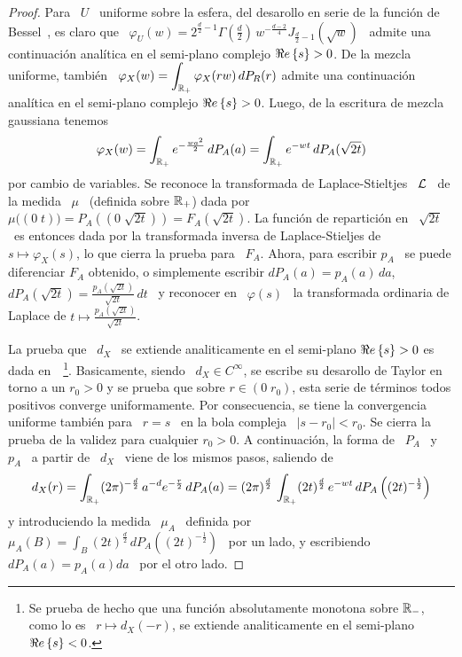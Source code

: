 \begin{proof}
  Para \ $U$ \ uniforme sobre la  esfera, del desarollo en serie de la funci\'on
  de   Bessel~\cite[Ec.~8.402]{GraRyz15},  es  claro   que  \   $\varphi_U(w)  =
  2^{\frac{d}{2}-1}  \Gamma\left(   \frac{d}{2}  \right)  \,  w^{-\frac{d-2}{4}}
  J_{\frac{d}{2}-1}(\sqrt{w})$  \ admite  una continuaci\'on  anal\'itica  en el
  semi-plano  complejo $\Re e \left\{ s \right\}  >  0$.   De la  mezcla  uniforme, tambi\'en  \
  $\displaystyle \varphi_X(w) = \int_{\mathbb{R}_+} \varphi_X(r w) \, dP_R(r)$ admite
  una  continuaci\'on   anal\'itica  en  el  semi-plano   complejo  $\Re e \left\{ s \right\}  >
  0$. Luego, de la escritura de mezcla gaussiana tenemos
  \[
  \varphi_X(w) = \int_{\mathbb{R}_+} e^{-\frac{w a^2}{2}} \, dP_A(a) = \int_{\mathbb{R}_+}
  e^{- w t} \, dP_A(\sqrt{2 t})
  \]
  por cambio  de variables. Se  reconoce la transformada de  Laplace-Stieltjes \
  $\mathcal{L}$ \ de la medida \ $\mu$  \ (definida sobre $\mathbb{R}_+$) dada por \ $\mu\big(
  (0  \;  t)  \big) =  P_A\left(  \left(  0  \;  \sqrt{2  t} \right)  \right)  =
  F_A(\sqrt{2  t})$.  La  funci\'on  de repartici\'on  en  \ $\sqrt{2  t}$ \  es
  entonces dada por la transformada  inversa de Laplace-Stieljes de \ $s \mapsto
  \varphi_X(s)$, lo  que cierra  la prueba para  \ $F_A$.  Ahora,  para escribir
  $p_A$ \ se puede diferenciar $F_A$ obtenido, o simplemente escribir $dP_A(a) =
  p_A(a) \, da$, \ie \ $dP_A(\sqrt{2 t}) = \frac{p_A(\sqrt{2 t})}{\sqrt{2 t}} \,
  dt$ \ y reconocer en \  $\varphi(s)$ \ la transformada ordinaria de Laplace de
  $t \mapsto \frac{p_A(\sqrt{2 t})}{\sqrt{2 t}}$.

  La prueba que \ $d_X$ \  se extiende analiticamente en el semi-plano $\Re e \left\{ s \right\}
  >0 $  es dada  en~\cite[Cap.~IV, Teo.~3a]{Wid46}~\footnote{Se prueba  de hecho
    que una  funci\'on absolutamente monotona sobre  $\mathbb{R}_-$, como lo  es \ $r
    \mapsto d_X(-r)$,  se extiende analiticamente  en el semi-plano  $\Re e \left\{ s \right\} <
    0$.}. Basicamente, siendo  \ $d_X \in C^\infty$, se  escribe su desarollo de
  Taylor en torno a un $r_0 > 0$ y  se prueba que sobre $r \in (0 \; r_0)$, esta
  serie de t\'erminos todos  positivos converge uniformamente. Por consecuencia,
  se  tiene la  convergencia uniforme  tambi\'en para  \ $r  = s$  \ en  la bola
  compleja \ $|s-r_0|  < r_0$. Se cierra la prueba de  la validez para cualquier
  $r_0 > 0$. A continuaci\'on,  la forma de \ $P_A$ \ y \ $p_A$  \ a partir de \
  $d_X$ \ viene de los mismos pasos, saliendo de
  \[
  d_X(r) =  \int_{\mathbb{R}_+} (2 \pi)^{-\frac{d}{2}} \,  a^{-d} e^{-\frac{r}{2}} \,
  dP_A(a) = (2 \pi)^{\frac{d}{2}}  \, \int_{\mathbb{R}_+} (2 t)^{\frac{d}{2}} \, e^{-
    w t} \, dP_A\left( (2 t)^{-\frac12} \right)
  \]
  y introduciendo la medida \ $\mu_A$ \ definida por \ $\displaystyle \mu_A(B) =
  \int_B (2  t)^{\frac{d}{2}} \, dP_A\left(  (2 t)^{-\frac12} \right)$ \  por un
  lado, y escribiendo \ $dP_A(a) = p_A(a) da$ \ por el otro lado.
\end{proof}

